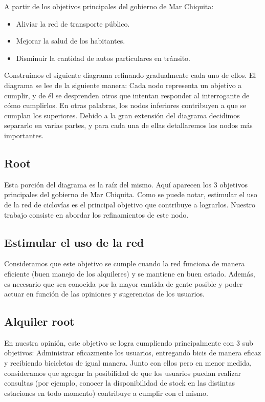 A partir de los objetivos principales del gobierno de Mar Chiquita:
\begin{itemize}
\item Aliviar la red de transporte público.
\item Mejorar la salud de los habitantes.
\item Disminuír la cantidad de autos particulares en tránsito. 
\end{itemize}

Construimos el siguiente diagrama refinando gradualmente cada uno de ellos. El diagrama se lee de la siguiente manera:
Cada nodo representa un objetivo a cumplir, y de él se desprenden otros que intentan responder al interrogante de cómo cumplirlos. En otras palabras, los nodos inferiores contribuyen a que se cumplan los superiores.
Debido a la gran extensión del diagrama decidimos separarlo en varias partes, y para cada una de ellas detallaremos los 
nodos más importantes.

\subsection{Root}

Esta porción del diagrama es la raíz del mismo. Aquí aparecen los 3 objetivos principales del gobierno de Mar Chiquita.
Como se puede notar, estimular el uso de la red de ciclovías es el principal objetivo que contribuye a lograrlos.
Nuestro trabajo consiste en abordar los refinamientos de este nodo.

\subsection{Estimular el uso de la red}

Consideramos que este objetivo se cumple cuando la red funciona de manera eficiente (buen manejo de los
alquileres) y se mantiene en buen estado. Además, es necesario que sea conocida por la mayor cantida de gente
posible y poder actuar en función de las opiniones y sugerencias de los usuarios.

\subsection{Alquiler root}

En nuestra opinión, este objetivo se logra cumpliendo principalmente con 3 sub objetivos:
Administrar eficazmente los usuarios, entregando bicis de manera eficaz y recibiendo bicicletas de igual
manera. 
Junto con ellos pero en menor medida, consideramos que agregar la posibilidad de que los usuarios puedan realizar consultas
(por ejemplo, conocer la disponibilidad de stock en las distintas estaciones en todo momento) contribuye a cumplir con el mismo.

